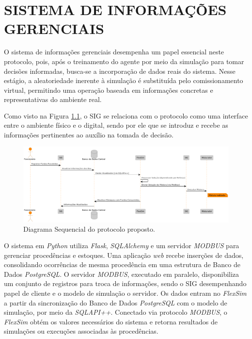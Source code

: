 \documentclass[
    12pt,                %
    openright,           %
    oneside,             %
    a4paper,             %
    english,             %
    spanish,             %
    brazil               %
]{ufscar}
\begin{document}
\chapter{SISTEMA DE INFORMAÇÕES GERENCIAIS}

O sistema de informações gerenciais desempenha um papel essencial neste protocolo, pois, após o treinamento do agente por meio da simulação para tomar decisões informadas, busca-se a incorporação de dados reais do sistema. Nesse estágio, a aleatoriedade inerente à simulação é substituída pelo comissionamento virtual, permitindo uma operação baseada em informações concretas e representativas do ambiente real.

Como visto na Figura \ref{figure:SIG}, o SIG se relaciona com o protocolo como uma interface entre o ambiente físico e o digital, sendo por ele que se introduz e recebe as informações pertinentes ao auxílio na tomada de decisão. 

\begin{figure}[hbt]
\centering
  \caption{Diagrama Sequencial do protocolo proposto.}
  \label{figure:SIG}
  \includegraphics[width=1\textwidth]{figures/SIG.png}
\end{figure}

O sistema em \textit{Python} utiliza \textit{Flask}, \textit{SQLAlchemy} e um servidor \textit{MODBUS} para gerenciar procedências e estoques. Uma aplicação \textit{web} recebe inserções de dados, consolidando ocorrências de mesma procedência em uma estrutura de Banco de Dados \textit{PostgreSQL}. O servidor \textit{MODBUS}, executado em paralelo, disponibiliza um conjunto de registros para troca de informações, sendo o SIG desempenhando papel de cliente e o modelo de simulação o servidor. Os dados entram no \textit{FlexSim} a partir da sincronização do Banco de Dados \textit{PostgreSQL} com o modelo de simulação, por meio da \textit{SQLAPI++}. Conectado via protocolo \textit{MODBUS}, o \textit{FlexSim} obtém os valores necessários do sistema e retorna resultados de simulações ou execuções associadas às procedências.
\end{document}
